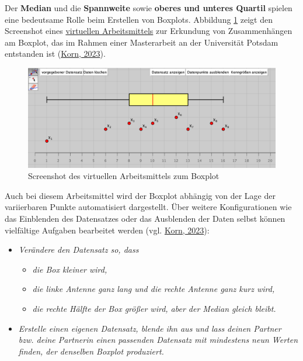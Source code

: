 \documentclass[
]{scrbook}
\providecommand{\tightlist}{%
  \setlength{\itemsep}{0pt}\setlength{\parskip}{0pt}}
\theoremstyle{definition}
\theoremstyle{definition}
\theoremstyle{definition}
\theoremstyle{definition}
\theoremstyle{remark}
\begin{document}
Der \textbf{Median} und die \textbf{Spannweite} sowie \textbf{oberes und unteres Quartil} spielen eine bedeutsame Rolle beim Erstellen von Boxplots. Abbildung \ref{fig:ScreenshotBoxplot} zeigt den Screenshot eines \href{files/Stoffdidaktik-WiSe2223-Kap11-Boxplot.html}{virtuellen Arbeitsmittels} zur Erkundung von Zusammenhängen am Boxplot, das im Rahmen einer Masterarbeit an der Universität Potsdam entstanden ist (\protect\hyperlink{ref-Korn2023}{Korn, 2023}).

\begin{figure}

{\centering \includegraphics[width=0.75\linewidth]{pictures/11-ScreenshotBoxplot} 

}

\caption{Screenshot des virtuellen Arbeitsmittels zum Boxplot}\label{fig:ScreenshotBoxplot}
\end{figure}

Auch bei diesem Arbeitsmittel wird der Boxplot abhängig von der Lage der variierbaren Punkte automatisiert dargestellt. Über weitere Konfigurationen wie das Einblenden des Datensatzes oder das Ausblenden der Daten selbst können vielfältige Aufgaben bearbeitet werden (vgl. \protect\hyperlink{ref-Korn2023}{Korn, 2023}):

\begin{itemize}
\tightlist
\item
  \emph{Verändere den Datensatz so, dass}

  \begin{itemize}
  \tightlist
  \item
    \emph{die Box kleiner wird,}
  \item
    \emph{die linke Antenne ganz lang und die rechte Antenne ganz kurz wird,}
  \item
    \emph{die rechte Hälfte der Box größer wird, aber der Median gleich bleibt.}
  \end{itemize}
\item
  \emph{Erstelle einen eigenen Datensatz, blende ihn aus und lass deinen Partner bzw. deine Partnerin einen passenden Datensatz mit mindestens neun Werten finden, der denselben Boxplot produziert.}
\end{itemize}
\end{document}
